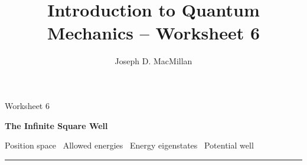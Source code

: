 \documentclass[10pt, letterpaper, twoside, openany]{article}
\title{Introduction to Quantum Mechanics -- Worksheet 6}
\author{Joseph D. MacMillan}
\date{}
\begin{document}
\pagestyle{fancy}

\Large \noindent Worksheet 6

\noindent \LARGE \textbf{The Infinite Square Well}

\normalsize

\vspace{0.2in}

\noindent Position space  \bullet \  Allowed energies   \bullet \ Energy eigenstates \bullet \ Potential well  

\vspace{0.1in}

\noindent \rule{\textwidth}{0.5pt}

\vspace{0.2in}
\end{document}
